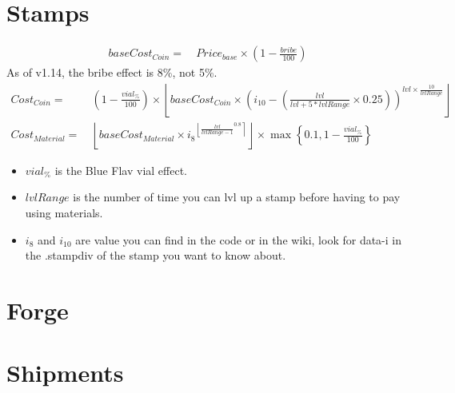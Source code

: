 \section{Stamps}
    \begin{align*}
        baseCost_{Coin} = &\ Price_{base} \times \left(1-\frac{bribe}{100}\right) 
    \end{align*}
    As of v1.14, the bribe effect is 8\%, not 5\%.
    \begin{align*}
        {Cost}_{Coin} = &\
            \left(1-\frac{vial_\%}{100}\right) \times 
            \left\lfloor 
                baseCost_{Coin} \times \left( i_{10} - \left( \frac{lvl}{lvl+5*lvlRange} \times 0.25 \right) \right)^{lvl \times \frac{10}{lvlRange}} 
            \right\rfloor 
    \\
    {Cost}_{Material} = &\
        \left\lfloor 
            baseCost_{Material} \times {i_8}^{
                \left\lfloor \frac{lvl}{lvlRange-1}^{0.8}\right\rceil  
            }
        \right\rfloor
        \times \max \left\{ 0.1, 1-\frac{vial_\%}{100} \right\}
    \end{align*}
    \begin{itemize}
        \item $vial_\%$ is the Blue Flav vial effect.
        \item $lvlRange$ is the number of time you can lvl up a stamp before having to pay using materials.
        \item $i_{8}$ and $i_{10}$ are value you can find in the code or in the wiki, look for data-i in the .stampdiv of the stamp you want to know about.
    \end{itemize}

\section{Forge}
    \imp{TODO}

\newpage
\section{Shipments}
    \begin{center}
    \end{center}

